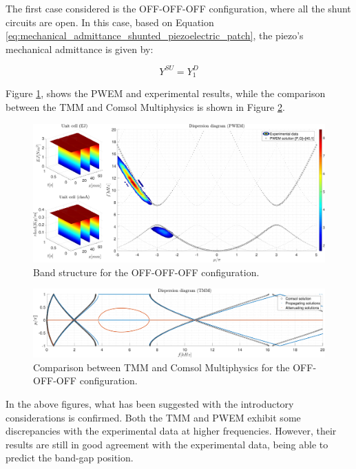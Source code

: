 The first case considered is the OFF-OFF-OFF configuration, where all the shunt circuits are open.
In this case, based on Equation \ref{eq:mechanical_admittance_shunted_piezoelectric_patch}, the piezo's mechanical admittance is given by:

\begin{equation}
    Y^{SU} = Y_1^D
\end{equation}

Figure \ref{fig:space_only_off_off_off}, shows the PWEM and experimental results, while the comparison between the TMM and Comsol Multiphysics is shown in Figure \ref{fig:space_only_off_off_off_comsol}.

\begin{figure}[H]
    \centering
    \includegraphics[width=\textwidth]{./img/MATLAB/PWEM_EXP OFF-OFF-OFF @0kHz.pdf}
    \caption{Band structure for the OFF-OFF-OFF configuration.}
    \label{fig:space_only_off_off_off}
\end{figure}

\begin{figure}[H]
    \centering
    \includegraphics[width=\textwidth]{./img/MATLAB/TMM_COMSOL OFF-OFF-OFF @0kHz.pdf}
    \caption{Comparison between TMM and Comsol Multiphysics for the OFF-OFF-OFF configuration.}
    \label{fig:space_only_off_off_off_comsol}
\end{figure}

In the above figures, what has been suggested with the introductory considerations is confirmed.
Both the TMM and PWEM exhibit some discrepancies with the experimental data at higher frequencies.
However, their results are still in good agreement with the experimental data, being able to predict the band-gap position.

